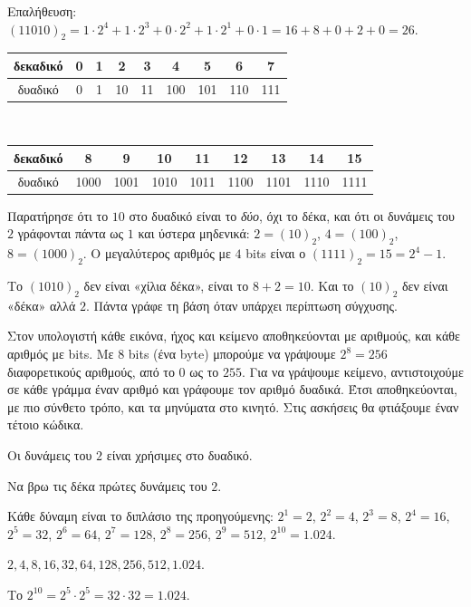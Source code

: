 Επαλήθευση: $(11010)_2=1\cdot 2^4+1\cdot 2^3+0\cdot 2^2+1\cdot 2^1+0\cdot 1=16+8+0+2+0=26$.


\begin{center}
\renewcommand{\arraystretch}{1.2}\setlength{\tabcolsep}{4pt}\small
\begin{tabular}{c|cccccccc}
δεκαδικό & 0 & 1 & 2 & 3 & 4 & 5 & 6 & 7\\\hline
δυαδικό & 0 & 1 & 10 & 11 & 100 & 101 & 110 & 111\\
\end{tabular}\\[6pt]
\begin{tabular}{c|cccccccc}
δεκαδικό & 8 & 9 & 10 & 11 & 12 & 13 & 14 & 15\\\hline
δυαδικό & 1000 & 1001 & 1010 & 1011 & 1100 & 1101 & 1110 & 1111\\
\end{tabular}
\end{center}

Παρατήρησε ότι το $10$ στο δυαδικό είναι το \emph{δύο}, όχι το δέκα, και ότι οι δυνάμεις του $2$ γράφονται πάντα ως $1$ και ύστερα μηδενικά: $2=(10)_2$, $4=(100)_2$, $8=(1000)_2$. Ο μεγαλύτερος αριθμός με $4$ bits είναι ο $(1111)_2=15=2^4-1$.

\begin{prosoxi}
Το $(1010)_2$ δεν είναι «χίλια δέκα», είναι το $8+2=10$. Και το $(10)_2$ δεν είναι «δέκα» αλλά $2$. Πάντα γράφε τη βάση όταν υπάρχει περίπτωση σύγχυσης.
\end{prosoxi}


Στον υπολογιστή κάθε εικόνα, ήχος και κείμενο αποθηκεύονται με αριθμούς, και κάθε αριθμός με bits. Με $8$ bits (ένα byte) μπορούμε να γράψουμε $2^8=256$ διαφορετικούς αριθμούς, από το $0$ ως το $255$. Για να γράψουμε κείμενο, αντιστοιχούμε σε κάθε γράμμα έναν αριθμό και γράφουμε τον αριθμό δυαδικά. Έτσι αποθηκεύονται, με πιο σύνθετο τρόπο, και τα μηνύματα στο κινητό. Στις ασκήσεις θα φτιάξουμε έναν τέτοιο κώδικα.


\tixero Οι δυνάμεις του $2$ είναι χρήσιμες στο δυαδικό.\par
\tithelo Να βρω τις δέκα πρώτες δυνάμεις του $2$.\par
\possindeo Κάθε δύναμη είναι το διπλάσιο της προηγούμενης: $2^1=2$, $2^2=4$, $2^3=8$, $2^4=16$, $2^5=32$, $2^6=64$, $2^7=128$, $2^8=256$, $2^9=512$, $2^{10}=1.024$.\par
\apantisi $2,4,8,16,32,64,128,256,512,1.024$.\par
\elegxos Το $2^{10}=2^5\cdot 2^5=32\cdot 32=1.024$.


